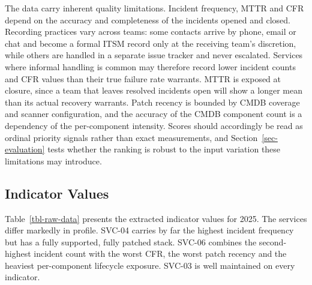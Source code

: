 \documentclass[
  authoryear,
  preprint]{elsarticle}
\begin{document}
The data carry inherent quality limitations. Incident frequency, MTTR
and CFR depend on the accuracy and completeness of the incidents opened
and closed. Recording practices vary across teams: some contacts arrive
by phone, email or chat and become a formal ITSM record only at the
receiving team's discretion, while others are handled in a separate
issue tracker and never escalated. Services where informal handling is
common may therefore record lower incident counts and CFR values than
their true failure rate warrants. MTTR is exposed at closure, since a
team that leaves resolved incidents open will show a longer mean than
its actual recovery warrants. Patch recency is bounded by CMDB coverage
and scanner configuration, and the accuracy of the CMDB component count
is a dependency of the per-component intensity. Scores should
accordingly be read as ordinal priority signals rather than exact
measurements, and Section~\ref{sec-evaluation} tests whether the ranking
is robust to the input variation these limitations may introduce.

\subsection{Indicator Values}\label{indicator-values}

Table~\ref{tbl-raw-data} presents the extracted indicator values for
2025. The services differ markedly in profile. SVC-04 carries by far the
highest incident frequency but has a fully supported, fully patched
stack. SVC-06 combines the second-highest incident count with the worst
CFR, the worst patch recency and the heaviest per-component lifecycle
exposure. SVC-03 is well maintained on every indicator.
\end{document}
